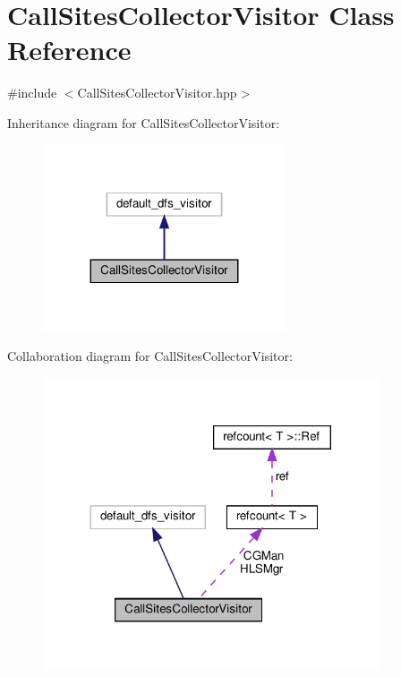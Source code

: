 \hypertarget{classCallSitesCollectorVisitor}{}\section{Call\+Sites\+Collector\+Visitor Class Reference}
\label{classCallSitesCollectorVisitor}


{\ttfamily \#include $<$Call\+Sites\+Collector\+Visitor.\+hpp$>$}



Inheritance diagram for Call\+Sites\+Collector\+Visitor\+:
\nopagebreak
\begin{figure}[H]
\begin{center}
\leavevmode
\includegraphics[width=203pt]{d7/d00/classCallSitesCollectorVisitor__inherit__graph}
\end{center}
\end{figure}


Collaboration diagram for Call\+Sites\+Collector\+Visitor\+:
\nopagebreak
\begin{figure}[H]
\begin{center}
\leavevmode
\includegraphics[width=281pt]{d9/d2e/classCallSitesCollectorVisitor__coll__graph}
\end{center}
\end{figure}
